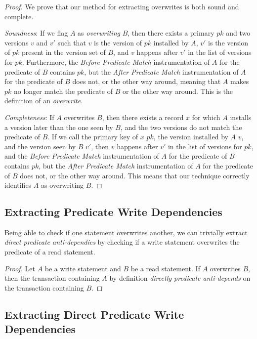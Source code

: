 \begin{proof}
We prove that our method for extracting overwrites is both sound and complete.

\textit{Soundness}: If we flag $A$ as \textit{overwriting} $B$, then there exists a primary $pk$ and two versions $v$ and $v'$ such that $v$ is the version of $pk$ installed by $A$, $v'$ is the version of $pk$ present in the version set of $B$, and $v$ happens after $v'$ in the list of versions for $pk$. Furthermore, the \textit{Before Predicate Match} instrumentation of $A$ for the predicate of $B$ contains $pk$, but the \textit{After Predicate Match} instrumentation of $A$ for the predicate of $B$ does not, or the other way around, meaning that $A$ makes $pk$ no longer match the predicate of $B$ or the other way around. This is the definition of an \textit{overwrite}.

\textit{Completeness}: If $A$ overwrites $B$, then there exists a record $x$ for which $A$ installs a version later than the one seen by $B$, and the two versions do not match the predicate of $B$. If we call the primary key of $x$ $pk$, the version installed by $A$ $v$, and the version seen by $B$ $v'$, then $v$ happens after $v'$ in the list of versions for $pk$, and the \textit{Before Predicate Match} instrumentation of $A$ for the predicate of $B$ contains $pk$, but the \textit{After Predicate Match} instrumentation of $A$ for the predicate of $B$ does not, or the other way around. This means that our technique correctly identifies $A$ as overwriting $B$.
\end{proof}

\subsection{Extracting Predicate Write Dependencies}

Being able to check if one statement overwrites another, we can trivially extract \textit{direct predicate anti-dependies} by checking if a write statement overwrites the predicate of a read statement.

\begin{proof}
    Let $A$ be a write statement and $B$ be a read statement. If $A$ overwrites $B$, then the transaction containing $A$ by definition \textit{directly predicate anti-depends} on the transaction containing $B$.
\end{proof}

\subsection{Extracting Direct Predicate Write Dependencies}

